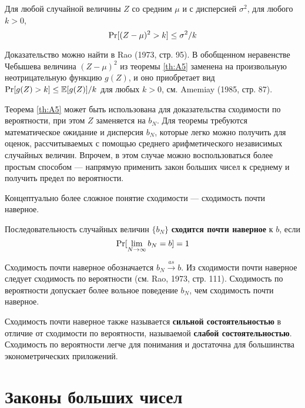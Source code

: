 \begin{theorem}
\label{th:A5}
Для любой случайной величины $Z$ со средним $\mu$ и с дисперсией $\sigma^2$, для любого $k > 0$,
\begin{equation}
\P[(Z-\mu)^2>k]\leq \sigma^2/k
\end{equation}
\end{theorem}

Доказательство можно найти в Rao (1973, стр. 95). В обобщенном неравенстве Чебышева величина $(Z-\mu)^2$ из теоремы \ref{th:A5} заменена на произвольную неотрицательную функцию $g(Z)$, и оно приобретает вид $\P[g(Z)>k]\leq \E[g(Z)]/k$ для любых $k>0$, см. Amemiay (1985, стр. 87).

Теорема \ref{th:A5} может быть использована для доказательства сходимости по вероятности, при этом $Z$ заменяется на $b_N$. Для  теоремы требуются математическое ожидание и дисперсия $b_N$, которые легко можно получить для оценок, рассчитываемых с помощью среднего арифметического независимых случайных величин. Впрочем, в этом случае можно воспользоваться более простым способом --- напрямую применить закон больших чисел к среднему и получить предел по вероятности.

Концептуально более сложное понятие сходимости --- сходимость почти наверное.

\begin{definition} Последовательность случайных величин $\{b_N\}$ \textbf{сходится почти наверное } к $b$, если
\begin{equation}
\P[\lim_{N\to\infty} b_N = b] = 1
\end{equation}
\end{definition}
Сходимость почти наверное обозначается $b_N \overset{as}{\to} b$. Из сходимости почти наверное следует сходимость по вероятности (см. Rao, 1973, стр. 111). Сходимость по вероятности допускает более вольное поведение $b_N$, чем сходимость почти наверное.

Сходимость почти наверное также называется \textbf{сильной состоятельностью} в отличие от сходимости по вероятности, называемой \textbf{слабой состоятельностью}. Сходимость по вероятности легче для понимания и достаточна для большинства эконометрических приложений.



\section{Законы больших чисел}

